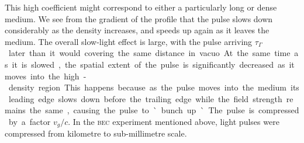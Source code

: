     This high coefficient might correspond to either a
    particularly long or dense medium. We see from the gradient of the profile
    that the pulse slows down considerably as the density increases, and speeds
    up again as it leaves the medium. The overall slow-light effect is large,
    with the pulse arriving \unit[8]{$\tau_\Gamma$} later than it would covering
    the same distance in vacuo.

    At the same time as it is slowed, the spatial extent of the pulse is
    significantly decreased as it moves into the high-density region. This
    happens because as the pulse moves into the medium its leading edge slows
    down before the trailing edge while the field strength remains the same,
    causing the pulse to `bunch up`. The pulse is compressed by a factor
    $v_g/c$.\cite{Hau1999} In the \textsc{bec} experiment mentioned above, light
    pulses were compressed from kilometre to sub-millimetre scale.





